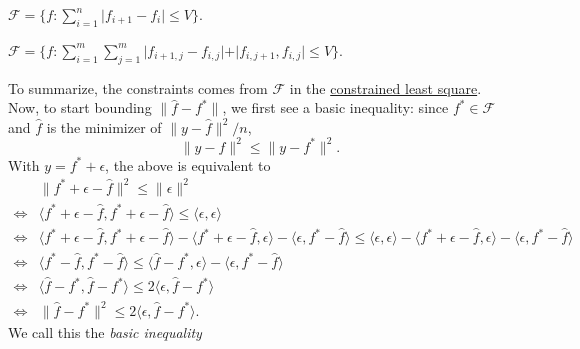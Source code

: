 \begin{eg}
	\(\mathscr{F} = \{f \colon \sum_{i = 1}^n \vert f_{i+1} - f_i \vert \leq V \} \).
\end{eg}

\begin{eg}
	\(\mathscr{F} = \{f \colon \sum_{i=1}^{m} \sum_{j=1}^{m} \vert f_{i+1, j} - f_{i, j} \vert + \vert f_{i, j+1} , f_{i, j} \vert \leq V \} \).
\end{eg}

To summarize, the constraints comes from \(\mathscr{F} \) in the \hyperref[prb:constrained-LS]{constrained least square}. Now, to start bounding \(\lVert \hat{f} - f^{\ast} \rVert \), we first see a basic inequality: since \(f^{\ast} \in \mathscr{F} \) and \(\hat{f} \) is the minimizer of \(\lVert y - \hat{f} \rVert ^2 / n \),
\[
	\lVert y - \hat{f} \rVert ^2 \leq \lVert y - f^{\ast} \rVert ^2.
\]
With \(y = f^{\ast} + \epsilon \), the above is equivalent to
\[
	\begin{split}
		     & \lVert f^{\ast} + \epsilon - \hat{f}  \rVert ^2 \leq \lVert \epsilon \rVert ^2                                                                                                                                                                                                                                                             \\
		\iff & \langle f^{\ast} + \epsilon - \hat{f} , f^{\ast} + \epsilon - \hat{f} \rangle \leq \langle \epsilon , \epsilon \rangle                                                                                                                                                                                                                     \\
		\iff & \langle f^{\ast} + \epsilon - \hat{f} , f^{\ast} + \epsilon - \hat{f} \rangle - \langle f^{\ast} + \epsilon - \hat{f}, \epsilon \rangle - \langle \epsilon , f^{\ast} - \hat{f} \rangle \leq \langle \epsilon , \epsilon \rangle - \langle f^{\ast} + \epsilon - \hat{f}, \epsilon \rangle - \langle \epsilon , f^{\ast} - \hat{f} \rangle \\
		\iff & \langle f^{\ast} - \hat{f} , f^{\ast} - \hat{f} \rangle \leq \langle \hat{f} - f^{\ast} , \epsilon \rangle - \langle \epsilon , f^{\ast} - \hat{f} \rangle                                                                                                                                                                                 \\
		\iff & \langle \hat{f} - f^{\ast} , \hat{f} - f^{\ast} \rangle \leq 2 \langle \epsilon , \hat{f} - f^{\ast} \rangle                                                                                                                                                                                                                               \\
		\iff & \lVert \hat{f} - f^{\ast}  \rVert ^2 \leq 2 \langle \epsilon , \hat{f} - f^{\ast}  \rangle .
	\end{split}
\]
We call this the \emph{basic inequality}

